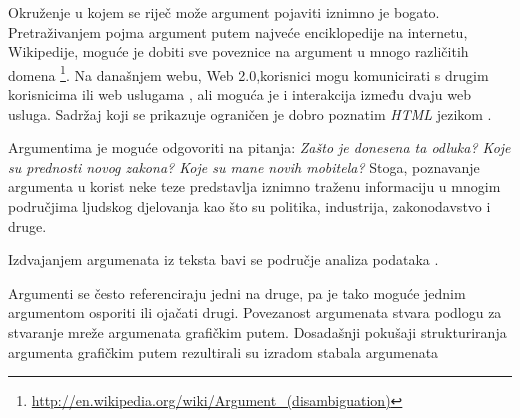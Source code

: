 Okruženje u kojem se riječ može argument pojaviti iznimno je bogato. Pretraživanjem pojma argument putem najveće enciklopedije na internetu, Wikipedije, moguće je dobiti sve poveznice na argument u mnogo različitih domena \footnote{\url{http://en.wikipedia.org/wiki/Argument_(disambiguation)}}. Na današnjem webu, Web 2.0,korisnici mogu komunicirati s drugim korisnicima ili web uslugama , ali moguća je i interakcija između dvaju web usluga. Sadržaj koji se prikazuje 
ograničen je dobro poznatim \emph{HTML} jezikom . 

Argumentima je moguće odgovoriti na pitanja: \emph{Zašto je donesena ta odluka? Koje su prednosti novog zakona? Koje su mane novih mobitela?} Stoga, poznavanje argumenta u korist neke teze predstavlja iznimno traženu informaciju u mnogim područjima ljudskog djelovanja kao što su politika, industrija, zakonodavstvo i druge. 

Izdvajanjem argumenata iz teksta bavi se područje analiza podataka .   

Argumenti se često referenciraju jedni na druge, pa je tako moguće jednim argumentom osporiti ili ojačati drugi. Povezanost argumenata stvara podlogu za stvaranje mreže argumenata grafičkim putem. Dosadašnji pokušaji strukturiranja argumenta grafičkim putem rezultirali su izradom stabala argumenata 